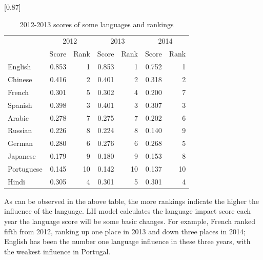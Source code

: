 \begin{table}[H]
	\centering
	\caption{2012-2013 scores of some languages and rankings}
	 \scalebox{0.87}[0.87]{%
	\begin{tabular}{p{4.11em}rrrrrr}
		\toprule
		\multicolumn{1}{c}{\multirow{2}[4]{*}{\backslashbox[0pt][l]{Language}{Time}}} & \multicolumn{2}{c}{2012} & \multicolumn{2}{c}{2013} & \multicolumn{2}{c}{2014} \\
		\cmidrule{2-7}    \multicolumn{1}{c}{} & \multicolumn{1}{p{4.11em}}{Score} & \multicolumn{1}{p{4.11em}}{Rank} & \multicolumn{1}{p{4.055em}}{Score} & \multicolumn{1}{p{4.055em}}{Rank} & \multicolumn{1}{p{4.055em}}{Score} & \multicolumn{1}{p{4.055em}}{Rank} \\
    \midrule
	English & 0.853  & 1     & 0.853  & 1     & 0.752  & 1 \\
	\midrule
	Chinese & 0.416  & 2     & 0.401  & 2     & 0.318  & 2 \\
	\midrule
	French & 0.301  & 5     & 0.302  & 4     & 0.200  & 7 \\
	\midrule
	Spanish & 0.398  & 3     & 0.401  & 3     & 0.307  & 3 \\
	\midrule
	Arabic & 0.278  & 7     & 0.275  & 7     & 0.202  & 6 \\
	\midrule
	Russian & 0.226  & 8     & 0.224  & 8     & 0.140  & 9 \\
	\midrule
	German & 0.280  & 6     & 0.276  & 6     & 0.268  & 5 \\
	\midrule
	Japanese & 0.179  & 9     & 0.180  & 9     & 0.153  & 8 \\
	\midrule
	Portuguese & 0.145  & 10    & 0.142  & 10    & 0.137  & 10 \\
	\midrule
	Hindi & 0.305  & 4     & 0.301  & 5     & 0.301  & 4 \\
	\bottomrule
	\end{tabular}%
}
	\label{tab:012}%
\end{table}%

 As can be observed in the above table, the more rankings indicate the higher the influence of the language. LII model calculates the language impact score each year the language score will be some basic changes. For example, French ranked fifth from 2012, ranking up one place in 2013 and down three places in 2014; English has been the number one language influence in these three years, with the weakest influence in Portugal.

